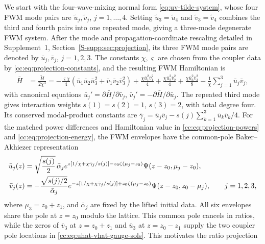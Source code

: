 \documentclass{optica-article}
\numberwithin{equation}{section}
\begin{document}
We start with the four-wave-mixing normal form \eqref{eq:uv-tilde-system}, whose four FWM mode pairs are $\tilde u_j,\tilde v_j$, $j=1,\ldots,4$.
Setting $\tilde u_3=\tilde u_4$ and $\tilde v_3=\tilde v_4$ combines the third and fourth pairs into one repeated mode, giving a three-mode degenerate FWM system.
After the mode and propagation-coordinate rescaling detailed in Supplement~1, Section~\ref*{S-supp:sec:projection}, its three FWM mode pairs are denoted by $\bar u_j,\bar v_j$, $j=1,2,3$.
The constants $\chi,\varsigma$ are chosen from the coupler data by \eqref{cc:eq:projection-constants}, and the resulting FWM Hamiltonian is
\begin{align}
\bar{H} &= \frac{\tilde{H}}{2 \chi^{3}} = - \frac{\varsigma \chi }{4}\left( \bar{u}_1 \bar{u}_2 \bar{u}^{2}_3 + \bar{v}_1 \bar{v}_2 \bar{v}^{2}_3 \right) + \frac{\chi \bar{u}^{2}_1 \bar{v}^{2}_1}{4} + \frac{\chi \bar{u}^{2}_2 \bar{v}^{2}_2}{4} + \frac{\chi \bar{u}^{2}_3 \bar{v}^{2}_3}{8} - \frac{1}{\chi}\sum_{j=1}^{3}\bar{u}_j \bar{v}_j, \label{cc:eq:Hbar-deg-fem}
\end{align}
with canonical equations $\bar u_j'=\partial\bar H/\partial\bar v_j$, $\bar v_j'=-\partial\bar H/\partial\bar u_j$.
The repeated third mode gives interaction weights $s(1)=s(2)=1$, $s(3)=2$, with total degree four.
Its conserved modal-product constants are $\bar\gamma_j=\bar u_j\bar v_j-s(j)\sum_{k=1}^3\bar u_k\bar v_k/4$.
For the matched power differences and Hamiltonian value in \eqref{cc:eq:projection-powers} and \eqref{cc:eq:projection-energy}, the FWM envelopes have the common-pole Baker--Akhiezer representation
\begin{align}
\bar u_j(z)&=\sqrt{\frac{s(j)}2}\,\bar\alpha_j
 e^{z[1/\chi+\chi\bar\gamma_j/s(j)]-z_0\zeta(\mu_j-z_0)}\Psi(z-z_0,\mu_j-z_0),\notag\\
\bar v_j(z)&=-\frac{\sqrt{s(j)/2}}{\bar\alpha_j}
 e^{-z[1/\chi+\chi\bar\gamma_j/s(j)]+z_0\zeta(\mu_j-z_0)}\Psi(z-z_0,z_0-\mu_j),
\qquad j=1,2,3,
\label{cc:eq:lifted-ba-modes}
\end{align}
where $\mu_3=z_0+z_1$, and $\bar\alpha_j$ are fixed by the lifted initial data.
All six envelopes share the pole at $z=z_0$ modulo the lattice.
This common pole cancels in ratios, while the zeros of $\bar v_3$ at $z=z_0+z_1$ and $\bar u_3$ at $z=z_0-z_1$ supply the two coupler pole locations in \eqref{cc:eq:uhat-vhat-gauge-sols}.
This motivates the ratio projection
\end{document}
